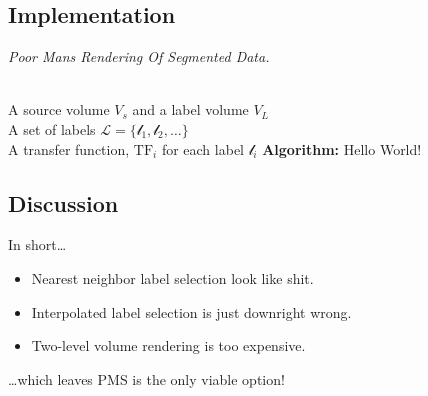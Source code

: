 \documentclass{egpubl}
\begin{document}
\subsection{Implementation}


\begin{algorithm}[t]
\renewcommand{\thealgorithm}{1}
\caption{\label{code:recon} \emph{Poor Mans Rendering Of Segmented Data.}}
\begin{algorithmic}
\REQUIRE \quad\\
A source volume $V_s$ and a label volume $V_L$ \\
A set of labels $\mathcal{L} = \{ \mathcal{l}_1, \mathcal{l}_2, \dots \}$ \\
A transfer function, $\mathrm{TF}_i$ for each label $\mathcal{l}_i$ 
\STATE \hspace{-3mm}\textbf{Algorithm:}
 \nonumber
\STATE Hello World!
\ENDFOR
\end{algorithmic}
\end{algorithm}


\subsection{Discussion}

In short\dots
\begin{itemize}
\item Nearest neighbor label selection look like shit. 
\item Interpolated label selection is just downright wrong. 
\item Two-level volume rendering is too expensive. 
\end{itemize}
\dots which leaves PMS is the only viable option!
\end{document}
